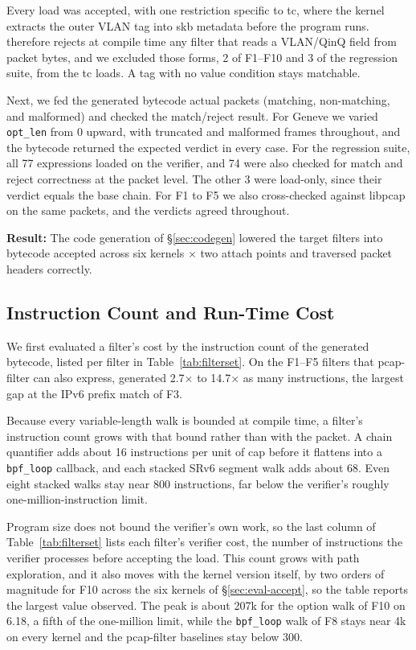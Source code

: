Every load was accepted, with one restriction specific to tc, where
the kernel extracts the outer VLAN tag into skb metadata before the
program runs. \kunai therefore rejects at compile time any filter that
reads a VLAN/QinQ field from packet bytes, and we excluded those
forms, 2 of F1--F10 and 3 of the regression suite, from the tc loads.
A tag with no value condition stays matchable.

Next, we fed the generated bytecode actual packets (matching,
non-matching, and malformed) and checked the match/reject result. For
Geneve we varied \texttt{opt\_len} from 0 upward, with truncated and
malformed frames throughout, and the bytecode returned the expected
verdict in every case. For the regression suite, all 77
expressions loaded on the verifier, and 74 were also checked for
match and reject correctness at the packet level. The other 3 were
load-only, since their verdict equals the base chain. For F1 to F5 we
also cross-checked \kunai against libpcap on the same packets, and the
verdicts agreed throughout.

\textbf{Result:} The code generation of \S\ref{sec:codegen} lowered
the target filters into bytecode accepted across six kernels
$\times$ two attach points and traversed packet headers correctly.

\subsection{Instruction Count and Run-Time Cost}
\label{sec:eval-cost}

We first evaluated a filter's cost by the instruction count of the
generated bytecode, listed per filter in Table~\ref{tab:filterset}. On
the F1--F5 filters that pcap-filter can also express, \kunai generated
2.7$\times$ to 14.7$\times$ as many instructions, the largest gap at
the IPv6 prefix match of F3.

Because every variable-length walk is bounded at compile time, a
filter's instruction count grows with that bound rather than with the
packet. A chain quantifier adds about 16 instructions per unit of cap
before it flattens into a \texttt{bpf\_loop} callback, and each stacked
SRv6 segment walk adds about 68. Even eight stacked walks stay near 800
instructions, far below the verifier's roughly one-million-instruction
limit.

Program size does not bound the verifier's own work, so the last
column of Table~\ref{tab:filterset} lists each filter's verifier cost,
the number of instructions the verifier processes before accepting the
load. This count grows with path exploration, and it also moves with
the kernel version itself, by two orders of magnitude for F10 across
the six kernels of \S\ref{sec:eval-accept}, so the table reports the
largest value observed. The peak is about 207k for the option walk of
F10 on 6.18, a fifth of the one-million limit, while the \texttt{bpf\_loop} walk of F8
stays near 4k on every kernel and the pcap-filter baselines stay below
300.

